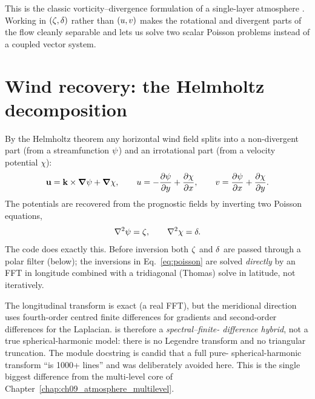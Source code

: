 This is the classic vorticity--divergence formulation of a single-layer atmosphere
\citep[Ch.~5]{vallis2017}. Working in $(\zeta,\delta)$ rather than $(u,v)$ makes
the rotational and divergent parts of the flow cleanly separable and lets us solve
two scalar Poisson problems instead of a coupled vector system.

\section{Wind recovery: the Helmholtz decomposition}

By the Helmholtz theorem any horizontal wind field splits into a non-divergent part
(from a streamfunction $\psi$) and an irrotational part (from a velocity
potential $\chi$):
\begin{equation}
  \mathbf{u} = \mathbf{k}\times\boldsymbol{\nabla}\psi + \boldsymbol{\nabla}\chi,
  \qquad
  u = -\frac{\partial \psi}{\partial y} + \frac{\partial \chi}{\partial x},
  \qquad
  v = \frac{\partial \psi}{\partial x} + \frac{\partial \chi}{\partial y}.
  \label{eq:helmholtz}
\end{equation}
The potentials are recovered from the prognostic fields by inverting two Poisson
equations,
\begin{equation}
  \nabla^{2}\psi = \zeta, \qquad \nabla^{2}\chi = \delta.
  \label{eq:poisson}
\end{equation}
The code does exactly this. Before inversion both $\zeta$ and $\delta$ are passed
through a polar filter (below); the inversions in
Eq.~\eqref{eq:poisson} are solved \emph{directly} by an FFT in longitude combined
with a tridiagonal (Thomas) solve in latitude, not iteratively.



\begin{remark}
The longitudinal transform is exact (a real FFT), but the meridional direction
uses fourth-order centred finite differences for gradients and second-order
differences for the Laplacian. \model{} is therefore a \emph{spectral--finite-
difference hybrid}, not a true spherical-harmonic model: there is no Legendre
transform and no triangular truncation. The module docstring is candid that a full
pure-\jax{} spherical-harmonic transform ``is 1000+ lines'' and was deliberately
avoided here. This is the single biggest difference from the multi-level
core of Chapter~\ref{chap:ch09_atmosphere_multilevel}.
\end{remark}

